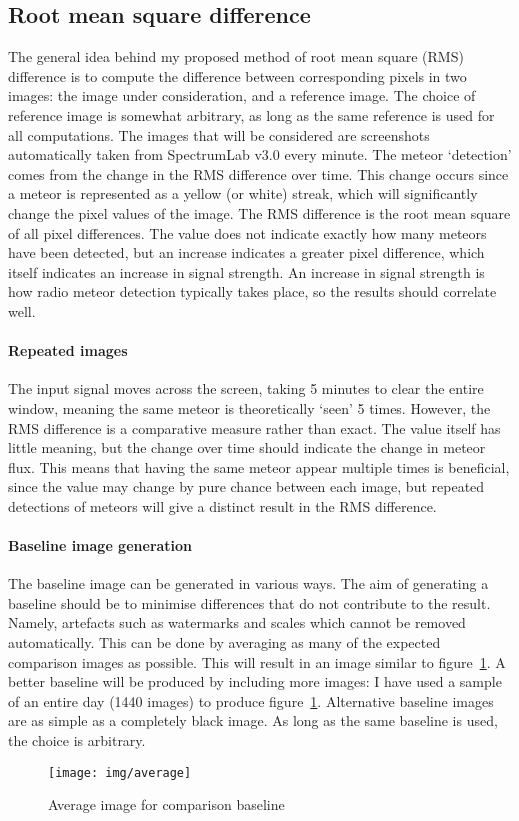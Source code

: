 \subsection{Root mean square difference}
The general idea behind my proposed method of root mean square (RMS) difference is to compute the difference between corresponding pixels in two images: the image under consideration, and a reference image. The choice of reference image is somewhat arbitrary, as long as the same reference is used for all computations. The images that will be considered are screenshots automatically taken from SpectrumLab v3.0 \cite{speclab} every minute. The meteor `detection' comes from the change in the RMS difference over time. This change occurs since a meteor is represented as a yellow (or white) streak, which will significantly change the pixel values of the image. The RMS difference is the root mean square of all pixel differences. The value does not indicate exactly how many meteors have been detected, but an increase indicates a greater pixel difference, which itself indicates an increase in signal strength. An increase in signal strength is how radio meteor detection typically takes place, so the results should correlate well.
\paragraph{Repeated images\\}
The input signal moves across the screen, taking 5 minutes to clear the entire window, meaning the same meteor is theoretically `seen' 5 times. However, the RMS difference is a comparative measure rather than exact. The value itself has little meaning, but the change over time should indicate the change in meteor flux. This means that having the same meteor appear multiple times is beneficial, since the value may change by pure chance between each image, but repeated detections of meteors will give a distinct result in the RMS difference.\\
\paragraph{Baseline image generation\\}
The baseline image can be generated in various ways. The aim of generating a baseline should be to minimise differences that do not contribute to the result. Namely, artefacts such as watermarks and scales which cannot be removed automatically. This can be done by averaging as many of the expected comparison images as possible. This will result in an image similar to figure~\ref{fig:img:avg}. A better baseline will be produced by including more images: I have used a sample of an entire day (1440 images) to produce figure~\ref{fig:img:avg}. Alternative baseline images are as simple as a completely black image. As long as the same baseline is used, the choice is arbitrary.
\begin{figure}
	\centering
	\texttt{[image: img/average]}
	\caption{Average image for comparison baseline
		\label{fig:img:avg}}
\end{figure}
